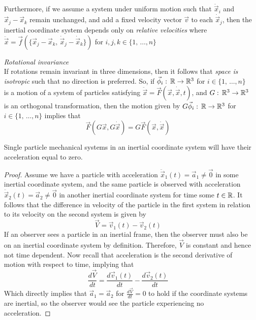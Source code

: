\documentclass{article}
\begin{document}
		Furthermore, if we assume a system under uniform motion such that $\ddot{\vec{x}}_i$ and $\vec{x}_j - \vec{x}_k$ remain unchanged, and add a fixed velocity vector $\vec{v}$ to each $\dot{\vec{x}}_j$, then the inertial coordinate system depends only on \textit{relative velocities} where $\ddot{\vec{x}} = \vec{f} \left( \{\vec{x}_j - \vec{x}_k, \,\dot{\vec{x}}_j - \dot{\vec{x}}_k\}\right)$ for $i,j,k \in \{1, \, \dots, n\}$
		\begin{exmp} \textit{Rotational invariance} \\
			If rotations remain invariant in three dimensions, then it follows that \textit{space is isotropic} such that no direction is preferred. So, if $\vec{\phi}_i : \, \mathbb{R} \to \mathbb{R}^3$ for $i \in \{ 1, \, \dots, n\}$ is a motion of a system of particles satisfying $\ddot{\vec{x}} = \vec{F} \left( \vec{x}, \dot{\vec{x}}, t \right)$, and $G: \, \mathbb{R}^3 \to \mathbb{R}^3$ is an orthogonal transformation, then the motion given by $G \vec{\phi}_i : \, \mathbb{R} \to \mathbb{R}^3$ for $i \in \{1, \, \dots, n\}$ implies that
			$$ \vec{F} \left(G \vec{x}, G \dot{\vec{x}} \right) = G \vec{F} \left(\vec{x}, \dot{\vec{x}} \right)$$ 
		\end{exmp}
		\begin{thm}
			Single particle mechanical systems in an inertial coordinate system will have their acceleration equal to zero.
		\end{thm}
		\begin{proof}
			Assume we have a particle with acceleration $\ddot{\vec{x}}_1 \left(t\right)= \vec{a}_1 \neq \vec{0}$ in some inertial coordinate system, and the same particle is observed with acceleration $\ddot{\vec{x}}_2 \left( t\right) = \vec{a}_2 \neq \vec{0}$ in another inertial coordinate system for time some $t \in \mathbb{R}$. It follows that the difference in velocity of the particle in the first system in relation to its velocity on the second system is given by
			$$ \vec{V} = \vec{v}_1 (t) - \vec{v}_2 (t)  $$
			If an observer sees a particle in an inertial frame, then the observer must also be on an inertial coordinate system by definition. Therefore, $\vec{V}$ is constant and hence not time dependent. Now recall that acceleration is the second derivative of motion with respect to time, implying that
			$$ \frac{d\vec{V}}{dt} = \frac{d \vec{v}_1 (t)}{dt} - \frac{d \vec{v}_2(t)}{dt} $$
			Which directly implies that $\vec{a}_1 = \vec{a}_2$ for $\frac{d\vec{V}}{dt} = 0$ to hold if the coordinate systems are inertial, so the observer would see the particle experiencing no acceleration.
		\end{proof}
\end{document}
